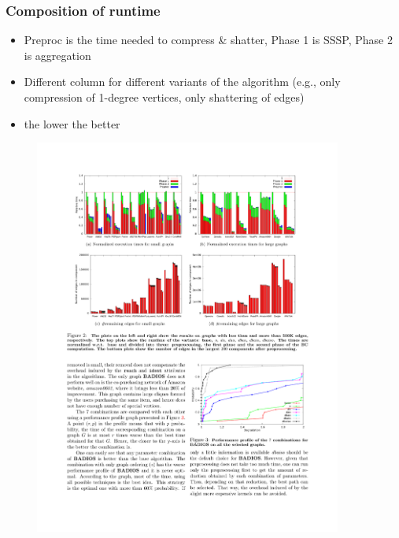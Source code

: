 \begin{frame}
  \frametitle{Composition of runtime}
  \begin{itemize}
    \item Preproc is the time needed to compress \& shatter, Phase 1 is SSSP,
      Phase 2 is aggregation
    \item Different column for different variants of the algorithm (e.g., only
      compression of 1-degree vertices, only shattering of edges)
    \item the lower the better
  \end{itemize}
  \begin{figure}
    \includegraphics[width=0.9\textwidth]{imgs/runtimesplitbadios.pdf}
  \end{figure}
\end{frame}


